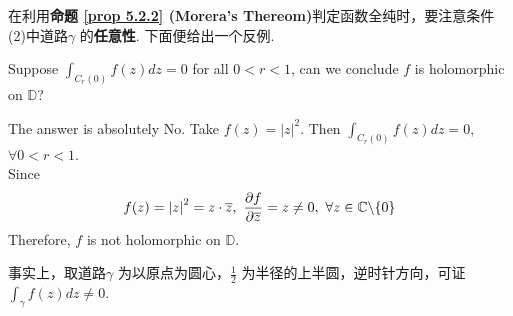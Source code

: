 \vspace{2em}
在利用\textbf{命题 \ref{prop 5.2.2} (Morera's Thereom)}判定函数全纯时，要注意条件 (2)中道路$\gamma$ 的\textbf{任意性}. 下面便给出一个反例.
\begin{example}\label{ex 5.2.1}
	Suppose $\int_{C_{r}(0)}{f(z) dz} = 0$ for all $0 < r < 1$, can we conclude $f$ is holomorphic on $\mathbb{D}$?
	
	\vspace{2em}
	\begin{solution}
		The answer is absolutely No. Take $f(z) = \left| z \right|^2$. Then $\int_{C_{r}(0)}{f(z) dz} = 0$, $\forall 0 < r < 1$. \\
		Since
		\begin{align}
			f(z) = \left| z \right|^2 = z \cdot \overline{z} , \,\, \frac{\partial f}{\partial \overline{z}} = z \neq 0 , \,\, \forall z \in \mathbb{C} \backslash \{ 0 \}
		\end{align}
		Therefore, $f$ is not holomorphic on $\mathbb{D}$.
		
		\begin{rmk}
			事实上，取道路$\gamma$ 为以原点为圆心，$\frac{1}{2}$ 为半径的上半圆，逆时针方向，可证$\int_{\gamma}{f(z) dz} \neq 0$.
		\end{rmk}
	\end{solution}
\end{example}






\newpage
